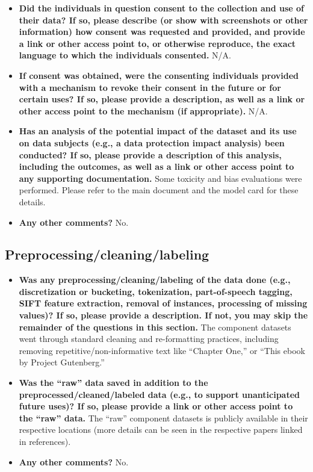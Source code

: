 \begin{itemize}
    \item \textbf{Did the individuals in question consent to the collection and use of their data? If so, please describe (or show with screenshots or other information) how consent was requested and provided, and provide a link or other access point to, or otherwise reproduce, the exact language to which the individuals consented.} N/A.
    \item \textbf{If consent was obtained, were the consenting individuals provided with a mechanism to revoke their consent in the future or for certain uses? If so, please provide a description, as well as a link or other access point to the mechanism (if appropriate).} N/A.
    \item \textbf{Has an analysis of the potential impact of the dataset and its use on data subjects (e.g., a data protection impact analysis) been conducted? If so, please provide a description of this analysis, including the outcomes, as well as a link or other access point to any supporting documentation.} Some toxicity and bias evaluations were performed. Please refer to the main document and the model card for these details.
    \item \textbf{Any other comments?} No.
\end{itemize}

\subsection{Preprocessing/cleaning/labeling}
\begin{itemize}
    \item \textbf{Was any preprocessing/cleaning/labeling of the data done (e.g., discretization or bucketing, tokenization, part-of-speech tagging, SIFT feature extraction, removal of instances, processing of missing values)? If so, please provide a description. If not, you may skip the remainder of the questions in this section.} The component datasets went through standard cleaning and re-formatting practices, including removing repetitive/non-informative text like ``Chapter One,'' or ``This ebook by Project Gutenberg.''
    \item \textbf{Was the ``raw'' data saved in addition to the preprocessed/cleaned/labeled data (e.g., to support unanticipated future uses)? If so, please provide a link or other access point to the ``raw'' data.} The ``raw'' component datasets is publicly available in their respective locations (more details can be seen in the respective papers linked in references).
    \item \textbf{Any other comments?} No.
\end{itemize}


